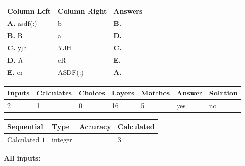 \documentclass[12pt]{article}
\begin{document}
  
 
 
\noindent{}
  
  
\begin{tabular}{|l|l|l|}
 \hline
 Column Left & Column Right  & Answers       \\ 
 \hline
{\textbf{\large{
A.}}}
asdf(:)
  & 
b
 & 
{\textbf{\large{
B.}}}
 \\ 
 \hline
{\textbf{\large{
B.}}}
B
  & 
a
 & 
{\textbf{\large{
D.}}}
 \\ 
 \hline
{\textbf{\large{
C.}}}
yjh
  & 
YJH
 & 
{\textbf{\large{
C.}}}
 \\ 
 \hline
{\textbf{\large{
D.}}}
A
  & 
eR
 & 
{\textbf{\large{
E.}}}
 \\ 
 \hline
{\textbf{\large{
E.}}}
er
  & 
ASDF(:)
 & 
{\textbf{\large{
A.}}}
 \\ 
 \hline
 \end{tabular}
  
  
 
 
\noindent{}
 
 
 
   
   
   
   
\noindent\begin{tabular}{|l|l|l|l|l|l|l|}
 \hline
Inputs & Calculates & Choices & Layers & Matches & Answer & Solution \\ \hline
           2 & 
           1 & 
           0
  & 
          16 & 
           5 & 
  yes & 
  no 
  \\ \hline
 \end{tabular}
   
   
   
   
\noindent{}
   
   
  
  
\noindent\begin{tabular}{|l|l|l|l|}
\hline
 Sequential & Type & Accuracy & Calculated \\ 
\hline
 
 
  Calculated $           1$ & integer &  & 
  $ 3 $ 
 \\  \hline  
 \end{tabular}
   
   
   
   
\noindent\vspace{0.1in}\hspace{-0.08in} {\textbf{\Large{All inputs: }}}
   
\end{document}
